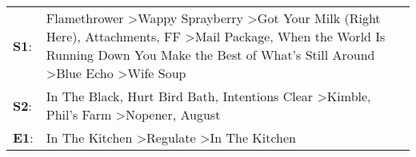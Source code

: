 \begin{supertabular}{p{0.03\textwidth}p{0.92\textwidth}}
 \textbf{S1}:  &  Flamethrower\textsuperscript{} \textgreater \enspace Wappy Sprayberry\textsuperscript{} \textgreater \enspace Got Your Milk (Right Here)\textsuperscript{}, \enspace Attachments\textsuperscript{}, \enspace FF\textsuperscript{} \textgreater \enspace Mail Package\textsuperscript{}, \enspace When the World Is Running Down You Make the Best of What's Still Around\textsuperscript{} \textgreater \enspace Blue Echo\textsuperscript{} \textgreater \enspace Wife Soup\textsuperscript{}  \enspace  \\
 \textbf{S2}:  &                                                                                                                                                                                                In The Black\textsuperscript{}, \enspace Hurt Bird Bath\textsuperscript{}, \enspace Intentions Clear\textsuperscript{} \textgreater \enspace Kimble\textsuperscript{}, \enspace Phil's Farm\textsuperscript{} \textgreater \enspace Nopener\textsuperscript{}, \enspace August\textsuperscript{}  \enspace  \\
 \textbf{E1}:  &                                                                                                                                                                                                                                                                                                                                                        In The Kitchen\textsuperscript{} \textgreater \enspace Regulate\textsuperscript{} \textgreater \enspace In The Kitchen\textsuperscript{}  \enspace  \\
\end{supertabular}
